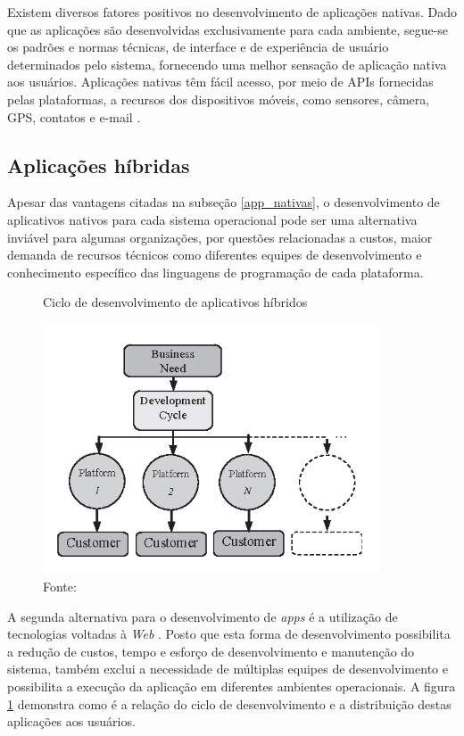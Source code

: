     Existem diversos fatores positivos no desenvolvimento de aplicações nativas. Dado que as aplicações são desenvolvidas exclusivamente para cada ambiente, segue-se os padrões e normas técnicas, de interface e de experiência de usuário determinados pelo sistema, fornecendo uma melhor sensação de aplicação nativa aos usuários. Aplicações nativas têm fácil acesso, por meio de APIs fornecidas pelas plataformas, a recursos dos dispositivos móveis, como sensores, câmera, GPS, contatos e e-mail \cite{S.ElKassas2015}.
    
    \subsection{Aplicações híbridas}
        \label{app_hibridas}
    
    Apesar das vantagens citadas na subseção \ref{app_nativas}, o desenvolvimento de aplicativos nativos para cada sistema operacional pode ser uma alternativa inviável para algumas organizações, por questões relacionadas a custos, maior demanda de recursos técnicos como diferentes equipes de desenvolvimento e conhecimento específico das linguagens de programação de cada plataforma.

    \begin{figure}[h]
    \caption{Ciclo de desenvolvimento de aplicativos híbridos}
    \centering %
    \includegraphics[width=10cm]{imagem/multiplataform-development.png}
    \caption*{Fonte: \cite{Corral2012}}
    \label{figura:multiplataform-development}
    \end{figure}
    
    
    A segunda alternativa para o desenvolvimento de \textit{apps} é a utilização de tecnologias voltadas à \textit{Web} \cite{S.ElKassas2015}. Posto que esta forma de desenvolvimento possibilita a redução de custos, tempo e esforço de desenvolvimento e manutenção do sistema, também exclui a necessidade de múltiplas equipes de desenvolvimento e possibilita a execução da aplicação em diferentes ambientes operacionais. A figura \ref{figura:multiplataform-development} demonstra como é a relação do ciclo de desenvolvimento e a distribuição destas aplicações aos usuários.
    
